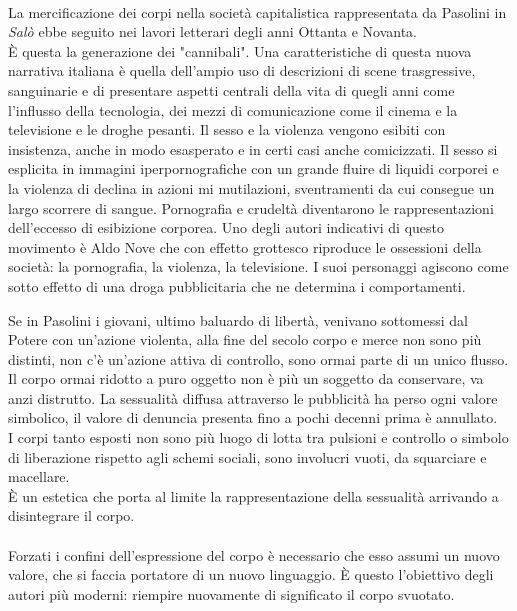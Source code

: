 \paragraph{}La mercificazione dei corpi nella società capitalistica rappresentata da Pasolini in \textit{Salò} ebbe seguito nei lavori letterari degli anni Ottanta e Novanta.
\\È questa la generazione dei "cannibali".
Una caratteristiche di questa nuova narrativa italiana è quella dell'ampio uso di descrizioni di scene trasgressive, sanguinarie e di presentare aspetti centrali della vita di quegli anni come l'influsso della tecnologia, dei mezzi di comunicazione come il cinema e la televisione e le droghe pesanti.
Il sesso e la violenza vengono esibiti con insistenza, anche in modo esasperato e in certi casi anche comicizzati.
Il sesso si esplicita in immagini iperpornografiche con un grande fluire di liquidi corporei e la violenza di declina in azioni mi mutilazioni, sventramenti da cui consegue un largo scorrere di sangue.
Pornografia e crudeltà diventarono le rappresentazioni dell'eccesso di esibizione corporea.
Uno degli autori indicativi di questo movimento è Aldo Nove che con effetto grottesco riproduce le ossessioni della società: la pornografia, la violenza, la televisione.
I suoi personaggi agiscono come sotto effetto di una droga pubblicitaria che ne determina i comportamenti.

Se in Pasolini i giovani, ultimo baluardo di libertà, venivano sottomessi dal Potere con un'azione violenta, alla fine del secolo corpo e merce non sono più distinti, non c'è un'azione attiva di controllo, sono ormai parte di un unico flusso.
Il corpo ormai ridotto a puro oggetto non è più un soggetto da conservare, va anzi distrutto.
La sessualità diffusa attraverso le pubblicità ha perso ogni valore simbolico, il valore di denuncia presenta fino a pochi decenni prima è annullato.
\\I corpi tanto esposti non sono più luogo di lotta tra pulsioni e controllo o simbolo di liberazione rispetto agli schemi sociali, sono involucri vuoti, da squarciare e macellare.
\\È un estetica che porta al limite la rappresentazione della sessualità arrivando a disintegrare il corpo.

\paragraph{}Forzati i confini dell'espressione del corpo è necessario che esso assumi un nuovo valore, che si faccia portatore di un nuovo linguaggio.
È questo l'obiettivo degli autori più moderni: riempire nuovamente di significato il corpo svuotato.






